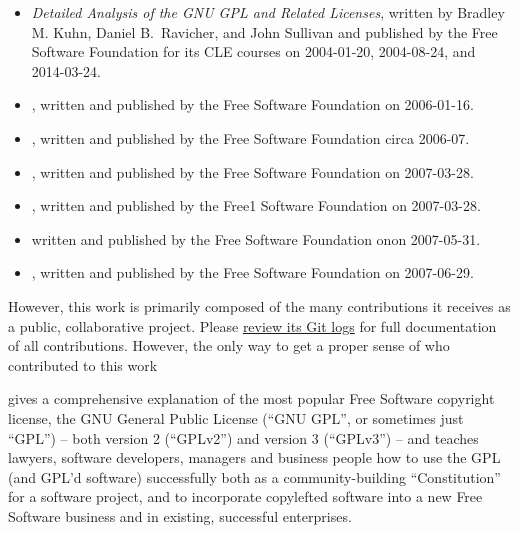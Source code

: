 {\begin{itemize}
\item \textit{Detailed Analysis of the GNU GPL and Related Licenses}, written by
Bradley M. Kuhn, Daniel B.~Ravicher, and John Sullivan and published by the Free Software Foundation for its CLE courses on 2004-01-20,
2004-08-24, and 2014-03-24.
\item {}, written and published by the Free
  Software Foundation on 2006-01-16.
\item {}, written and published by the Free
  Software Foundation circa 2006-07.
\item {}, written and published by the Free
  Software Foundation on   2007-03-28.
\item {}, written and published by the Free1 Software Foundation on   2007-03-28.
\item {} written and published by the Free
  Software Foundation onon 2007-05-31.
\item {}, written and published by the Free
  Software Foundation on 2007-06-29.
  
\end{itemize}

However, this work is primarily composed of the many contributions it
receives as a public, collaborative project.  Please
\href{https://gitorious.org/copyleft-org/tutorial/history/master:gpl-lgpl.tex}{review
  its Git logs} for full documentation of all contributions.
However, the only way to get a proper sense of who contributed to this work
}
\pagebreak

 gives a
comprehensive explanation of the most popular Free Software copyright
license, the GNU General Public License (``GNU GPL'', or sometimes just
``GPL'') -- both version 2 (``GPLv2'') and version 3 (``GPLv3'') -- and
teaches lawyers, software developers, managers and business people how to use
the GPL (and GPL'd software) successfully both as a community-building
``Constitution'' for a software project, and to incorporate copylefted
software into a new Free Software business and in existing, successful
enterprises.

